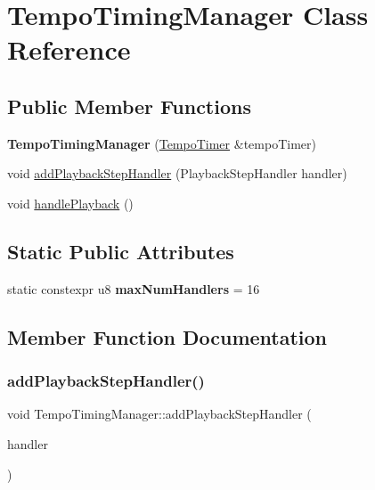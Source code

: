\hypertarget{class_tempo_timing_manager}{}\section{Tempo\+Timing\+Manager Class Reference}
\label{class_tempo_timing_manager}
\subsection*{Public Member Functions}
\begin{DoxyCompactItemize}
\item 
\mbox{\label{class_tempo_timing_manager_a1001a3fdd1d051076fb440da068cf11a}} 
{\bfseries Tempo\+Timing\+Manager} (\mbox{\hyperlink{class_tempo_timer}{Tempo\+Timer}} \&tempo\+Timer)
\item 
void \mbox{\hyperlink{class_tempo_timing_manager_aff742971bd50205edc863163c7674740}{add\+Playback\+Step\+Handler}} (Playback\+Step\+Handler handler)
\item 
void \mbox{\hyperlink{class_tempo_timing_manager_a697545e7fa499a13630d2f224eac4fac}{handle\+Playback}} ()
\end{DoxyCompactItemize}
\subsection*{Static Public Attributes}
\begin{DoxyCompactItemize}
\item 
\mbox{\label{class_tempo_timing_manager_aa0987abea44aeac79ca46b859ae444a1}} 
static constexpr u8 {\bfseries max\+Num\+Handlers} = 16
\end{DoxyCompactItemize}


\subsection{Member Function Documentation}
\mbox{\label{class_tempo_timing_manager_aff742971bd50205edc863163c7674740}} 
\subsubsection{\texorpdfstring{add\+Playback\+Step\+Handler()}{addPlaybackStepHandler()}}
{\footnotesize\ttfamily void Tempo\+Timing\+Manager\+::add\+Playback\+Step\+Handler (\begin{DoxyParamCaption}\item[{Playback\+Step\+Handler}]{handler }\end{DoxyParamCaption})}

